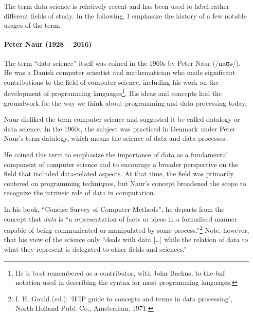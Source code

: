 The term data science is relatively recent and has been used to label rather different fields of
study.  In the following, I emphasize the history of a few notable usages of the term.

\def\naurds{(0,0) circle (20mm)}
\def\naurcs{(0:5mm) circle (15mm)}
\def\naurde{(0:40mm) circle (15mm)}



\paragraph{Peter Naur (1928 -- 2016)}

The term ``data science'' itself was coined in the 1960s by Peter Naur (/naʊə/). He was
a Danish computer scientist and mathematician who made significant contributions to the
field of computer science, including his work on the development of programming
languages\footnote{He is best remembered as a contributor, with John Backus, to the
\gls{bnf} notation used in describing the syntax for most programming
languages.}.
His ideas and concepts laid the groundwork for the way we think about programming and data
processing today.

Naur disliked the term computer science and suggested it be called datalogy or data
science.  In the 1960s, the subject was practiced in Denmark under Peter
Naur's term datalogy, which means the science of data and data processes.

He coined this term to emphasize the importance of data as a fundamental component of
computer science and to encourage a broader perspective on the field that included
data-related aspects. At that time, the field was primarily centered on programming
techniques, but Naur's concept broadened the scope to recognize the intrinsic role of data
in computation.

In his book, ``Concise Survey of Computer Methods'', he
departs from the concept that \emph{data} is ``a representation of facts or ideas in a
formalised manner capable of being communicated or manipulated by some
process.''\footnote{I. H. Gould (ed.): ‘IFIP guide to concepts and terms in data
processing’, North-Holland Publ. Co., Amsterdam, 1971.} Note, however, that his view of the
science only ``deals with data [\dots] while the relation of data to what they represent
is delegated to other fields and sciences.''

